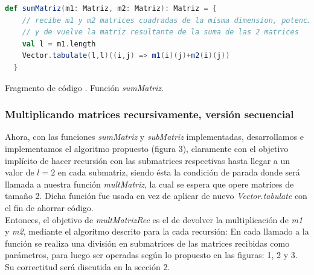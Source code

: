 \documentclass{article}
\newcounter{codesnippet}
\newcommand{\newcodesnippet}{%
  \stepcounter{codesnippet}%
}
\begin{document}
\newcodesnippet
\begin{lstlisting}[language=Scala]
  def sumMatriz(m1: Matriz, m2: Matriz): Matriz = {
    // recibe m1 y m2 matrices cuadradas de la misma dimension, potencia de 2
    // y de vuelve la matriz resultante de la suma de las 2 matrices
    val l = m1.length
    Vector.tabulate(l,l)((i,j) => m1(i)(j)+m2(i)(j))
  }
\end{lstlisting}
\begin{center}
    \small{Fragmento de código \thecodesnippet. Función \textit{sumMatriz}.}
\end{center}
\subsubsection{Multiplicando matrices recursivamente, versión secuencial}

Ahora, con las funciones \textit{sumMatriz} y \textit{subMatriz} implementadas, desarrollamos e implementamos el algoritmo propuesto (figura 3), claramente con el objetivo implícito de hacer recursión con las submatrices respectivas hasta llegar a un valor de \(l = 2\) en cada submatriz, siendo ésta la condición de parada donde será llamada a nuestra función \textit{multMatriz}, la cual se espera que opere matrices de tamaño 2. Dicha función fue usada en vez de aplicar de nuevo \textit{Vector.tabulate} con el fin de ahorrar código.\\

Entonces, el objetivo de \textit{multMatrizRec} es el de devolver la multiplicación de \textit{m1} y \textit{m2}, mediante el algoritmo descrito para la cada recursión: En cada llamado a la función se realiza una división en submatrices de las matrices recibidas como parámetros, para luego ser operadas según lo propuesto en las figuras: 1, 2 y 3. Su correctitud será discutida en la sección 2.
\end{document}
